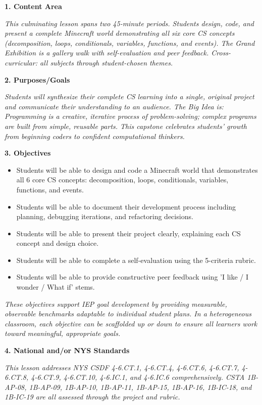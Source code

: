 \documentclass[11pt,letterpaper]{article}
\begin{document}
\textbf{1. Content Area}

\textit{This culminating lesson spans two 45-minute periods. Students design, code, and present a complete Minecraft world demonstrating all six core CS concepts (decomposition, loops, conditionals, variables, functions, and events). The Grand Exhibition is a gallery walk with self-evaluation and peer feedback. Cross-curricular: all subjects through student-chosen themes.}

\textbf{2. Purposes/Goals}

\textit{Students will synthesize their complete CS learning into a single, original project and communicate their understanding to an audience. The Big Idea is: Programming is a creative, iterative process of problem-solving; complex programs are built from simple, reusable parts. This capstone celebrates students' growth from beginning coders to confident computational thinkers.}

\textbf{3. Objectives}

\begin{itemize}
  \item Students will be able to design and code a Minecraft world that demonstrates all 6 core CS concepts: decomposition, loops, conditionals, variables, functions, and events.

  \item Students will be able to document their development process including planning, debugging iterations, and refactoring decisions.

  \item Students will be able to present their project clearly, explaining each CS concept and design choice.

  \item Students will be able to complete a self-evaluation using the 5-criteria rubric.

  \item Students will be able to provide constructive peer feedback using 'I like / I wonder / What if' stems.
\end{itemize}

\textit{These objectives support IEP goal development by providing measurable, observable benchmarks adaptable to individual student plans. In a heterogeneous classroom, each objective can be scaffolded up or down to ensure all learners work toward meaningful, appropriate goals.}

\textbf{4. National and/or NYS Standards}

\textit{This lesson addresses NYS CSDF 4-6.CT.1, 4-6.CT.4, 4-6.CT.6, 4-6.CT.7, 4-6.CT.8, 4-6.CT.9, 4-6.CT.10, 4-6.IC.1, and 4-6.IC.6 comprehensively. CSTA 1B-AP-08, 1B-AP-09, 1B-AP-10, 1B-AP-11, 1B-AP-15, 1B-AP-16, 1B-IC-18, and 1B-IC-19 are all assessed through the project and rubric.}
\end{document}
